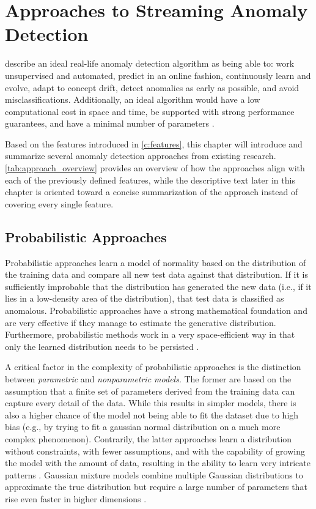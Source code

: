 \chapter{Approaches to Streaming Anomaly Detection}
\label{c:approaches}

\citet{ahmad_unsupervised_2017} describe an ideal real-life anomaly detection algorithm as being able to: work unsupervised and automated, predict in an online fashion, continuously learn and evolve, adapt to concept drift, detect anomalies as early as possible, and avoid misclassifications. Additionally, an ideal algorithm would have a low computational cost in space and time, be supported with strong performance guarantees, and have a minimal number of parameters \citep{bifet_new_2009}.

Based on the features introduced in \cref{c:features}, this chapter will introduce and summarize several anomaly detection approaches from existing research. \cref{tab:approach_overview} provides an overview of how the approaches align with each of the previously defined features, while the descriptive text later in this chapter is oriented toward a concise summarization of the approach instead of covering every single feature.

\section{Probabilistic Approaches}
Probabilistic approaches learn a model of normality based on the distribution of the training data and compare all new test data against that distribution. If it is sufficiently improbable that the distribution has generated the new data (i.e., if it lies in a low-density area of the distribution), that test data is classified as anomalous. Probabilistic approaches have a strong mathematical foundation and are very effective if they manage to estimate the generative distribution. Furthermore, probabilistic methods work in a very space-efficient way in that only the learned distribution needs to be persisted \citep{pimentel_review_2014}.

A critical factor in the complexity of probabilistic approaches is the distinction between \emph{parametric} and \emph{nonparametric models}. The former are based on the assumption that a finite set of parameters derived from the training data can capture every detail of the data. While this results in simpler models, there is also a higher chance of the model not being able to fit the dataset due to high bias (e.g., by trying to fit a gaussian normal distribution on a much more complex phenomenon). Contrarily, the latter approaches learn a distribution without constraints, with fewer assumptions, and with the capability of growing the model with the amount of data, resulting in the ability to learn very intricate patterns \citep{pimentel_review_2014}. Gaussian mixture models combine multiple Gaussian distributions to approximate the true distribution but require a large number of parameters that rise even faster in higher dimensions \citep{schneider_expected_2016}.

